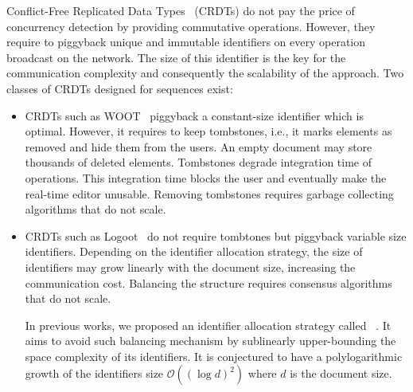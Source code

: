 Conflict-Free Replicated Data Types~\cite{shapiro2011comprehensive} (CRDTs) do
not pay the price of concurrency detection by providing commutative
operations. However, they require to piggyback unique and immutable identifiers
on every operation broadcast on the network. The size of this identifier is the
key for the communication complexity and consequently the scalability of the
approach. Two classes of CRDTs designed for sequences exist:
\begin{itemize}
\item CRDTs such as WOOT~\cite{oster2006data} piggyback a constant-size
  identifier which is optimal. However, it requires to keep tombstones, i.e., it
  marks elements as removed and hide them from the users. An empty document may
  store thousands of deleted elements. Tombstones degrade integration time of
  operations. This integration time blocks the user and eventually make the
  real-time editor unusable. Removing tombstones requires garbage
  collecting algorithms that do not scale.
\item CRDTs such as Logoot~\cite{weiss2010logootundo} do not require tombtones
  but piggyback variable size identifiers. Depending on the identifier
  allocation strategy, the size of identifiers may grow linearly with the
  document size, increasing the communication cost. Balancing the structure
  requires consensus algorithms that do not scale.

  In previous works, we proposed an identifier allocation strategy called
  \LSEQ~\cite{nedelec2013concurrency, nedelec2013lseq}. It aims to avoid such
  balancing mechanism by sublinearly upper-bounding the space complexity of its
  identifiers. It is conjectured to have a polylogarithmic growth of the
  identifiers size $\mathcal{O}((\log d)^2)$ where $d$ is the document
  size. %
\end{itemize}


